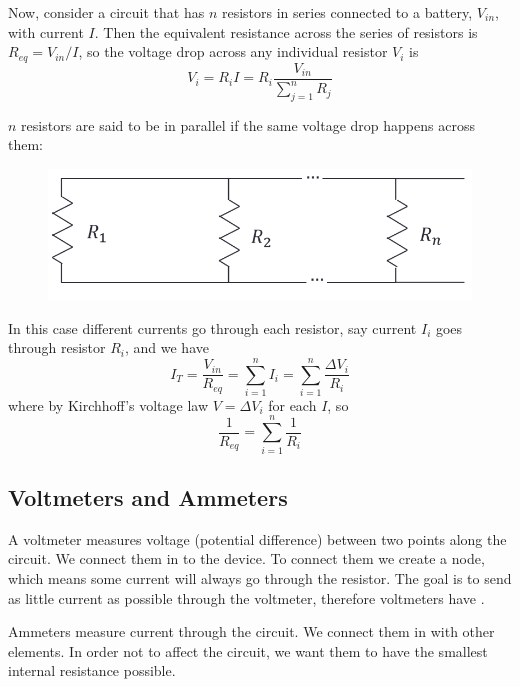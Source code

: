 \documentclass[12pt, a4paper, oneside, openright, titlepage]{book}
\begin{document}
Now, consider a circuit that has $n$ resistors in series connected to a battery, $V_{in}$, with current $I$. Then the equivalent resistance across the series of resistors is $R_{eq} = V_{in}/I$, so the voltage drop across any individual resistor $V_i$ is $$V_i = R_iI = R_i \frac{V_{in}}{\sum_{j=1}^nR_j}$$

\begin{defn}
    $n$ resistors are said to be in parallel if the same voltage drop happens across them:
    \begin{figure}[H]
        \centering
        \includegraphics[scale = 0.8]{Images/TH4.PNG}
    \end{figure}
    In this case different currents go through each resistor, say current $I_i$ goes through resistor $R_i$, and we have $$I_T = \frac{V_{in}}{R_{eq}} = \sum_{i=1}^nI_i = \sum_{i=1}^n\frac{\Delta V_i}{R_i}$$ where by Kirchhoff's voltage law $V = \Delta V_i$ for each $I$, so $$\frac{1}{R_{eq}} = \sum_{i=1}^n\frac{1}{R_i}$$
\end{defn}

\subsection{Voltmeters and Ammeters}

\begin{defn}
    A voltmeter measures voltage (potential difference) between two points along the circuit. We connect them in  to the device. To connect them we create a node, which means some current will always go through the resistor. The goal is to send as little current as possible through the voltmeter, therefore voltmeters have .
\end{defn}

\begin{defn}
    Ammeters measure current through the circuit. We connect them in  with other elements. In order not to affect the circuit, we want them to have the smallest internal resistance possible.
\end{defn}
\end{document}

